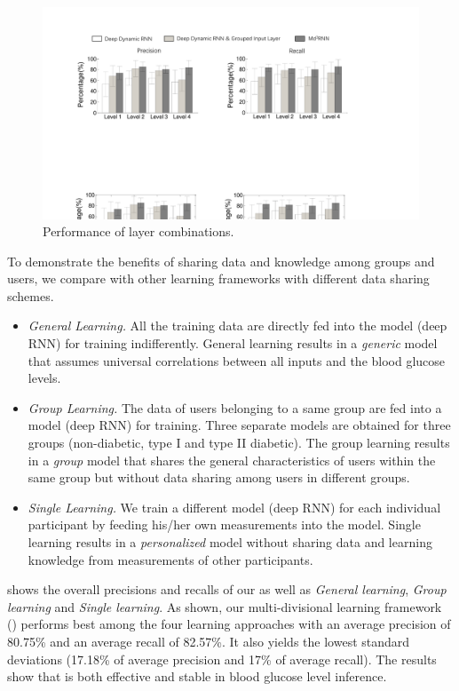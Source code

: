 \begin{figure}[h]
  \centering
  \includegraphics[width=0.9\columnwidth]{./img/CMP_Models1.pdf}
  \caption{Performance of layer combinations.}
  \label{fig:cmp_model}
\end{figure}

To demonstrate the benefits of sharing data and knowledge among groups and users, we compare \modelname with other learning frameworks with different data sharing schemes.
\begin{itemize}
  \item \emph{General Learning.}
  All the training data are directly fed into the model (\ie deep RNN) for training indifferently.
  General learning results in a \emph{generic} model that assumes universal correlations between all inputs and the blood glucose levels.
  \item \emph{Group Learning.}
  The data of users belonging to a same group are fed into a model (\ie deep RNN) for training.
  Three separate models are obtained for three groups (\ie non-diabetic, type I and type II diabetic).
  The group learning results in a \emph{group} model that shares the general characteristics of users within the same group but without data sharing among users in different groups.
  \item \emph{Single Learning.}
  We train a different model (\ie deep RNN) for each individual participant by feeding his/her own measurements into the model.
  Single learning results in a \emph{personalized} model without sharing data and learning knowledge from measurements of other participants.
\end{itemize}

 shows the overall precisions and recalls of our \modelname as well as \emph{General learning}, \emph{Group learning} and \emph{Single learning}.
As shown, our multi-divisional learning framework (\modelname) performs best among the four learning approaches with an average precision of 80.75\% and an average recall of 82.57\%.
It also yields the lowest standard deviations (17.18\% of average precision and 17\% of average recall).
The results show that \modelname is both effective and stable in blood glucose level inference.

